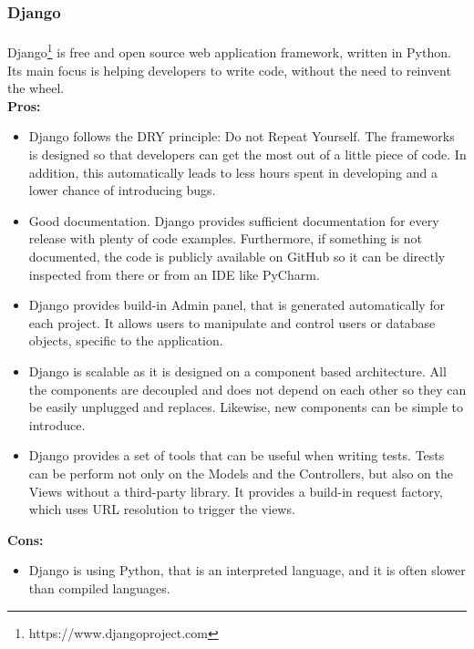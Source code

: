 \documentclass{l4proj}
\begin{document}
\subsubsection{Django}
\paragraph{}
Django\footnote{https://www.djangoproject.com} is free and open source web application framework, written in Python. Its main focus is helping developers to write code, without the need to reinvent the wheel.
\\ \textbf{Pros:}
\begin{itemize}
	\item Django follows the DRY principle: Do not Repeat Yourself. The frameworks is designed so that developers can get the most out of a little piece of code. In addition, this automatically leads to less hours spent in developing and a lower chance of introducing bugs.
	\item Good documentation. Django provides sufficient documentation for every release with plenty of code examples. Furthermore, if something is not documented, the code is publicly available on GitHub so 
	it can be directly inspected from there or from an IDE like PyCharm. 
	\item Django provides build-in Admin panel, that is generated automatically for each project. It allows users to manipulate and control users or database objects, specific to the application.
	\item Django is scalable as it is designed on a component based architecture. All the components are decoupled and does not depend on each other so they can be easily unplugged and replaces. Likewise, new components can be simple to introduce. 
	\item Django provides a set of tools that can be useful when writing tests. Tests can be perform not only on the Models and the Controllers, but also on the Views without a third-party library. It provides a build-in request factory, which uses URL resolution to trigger the views. 
\end{itemize}
\textbf{Cons:}
\begin{itemize}
	\item Django is using Python, that is an interpreted language, and it is often slower than compiled languages.  
\end{itemize}
\end{document}
